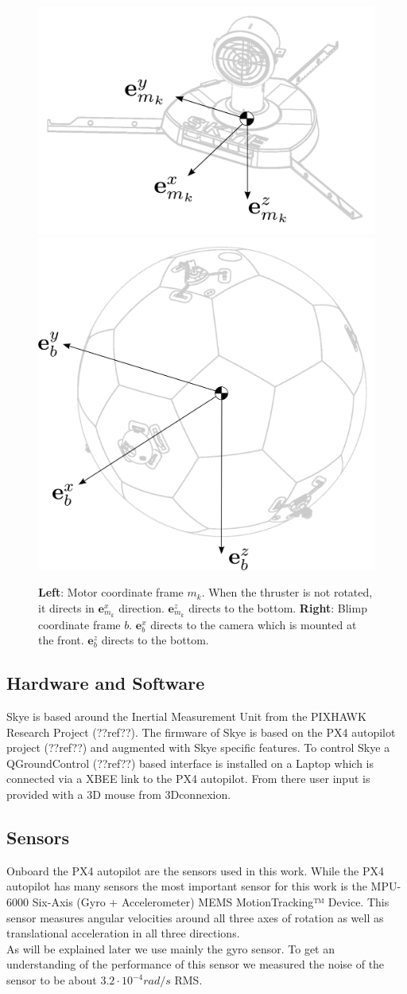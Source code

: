 \begin{figure}[hbtp]
\centering
\includegraphics[width=.4\linewidth]{images/motor_frame.png}
\includegraphics[width=.4\linewidth]{images/blimp_frame.png}
\caption{\textbf{Left}: Motor coordinate frame $m_k$. When the thruster is not rotated, it directs in $\mathbf{e}^x_{m_k}$ direction. $\mathbf{e}^z_{m_k}$ directs to the bottom. \textbf{Right}: Blimp coordinate frame $b$. $\mathbf{e}^x_{b}$ directs to the camera which is mounted at the front. $\mathbf{e}^z_{b}$ directs to the bottom.}
\label{fig:frames}
\end{figure}

\subsection{Hardware and Software}
Skye is based around the Inertial Measurement Unit from the PIXHAWK Research Project (??ref??). 
The firmware of Skye is based on the PX4 autopilot project (??ref??) and augmented with Skye specific features.
To control Skye a QGroundControl (??ref??) based interface is installed on a Laptop which is connected via a XBEE link to the PX4 autopilot.
From there user input is provided with a 3D mouse from 3Dconnexion.

\subsection{Sensors}
Onboard the PX4 autopilot are the sensors used in this work.
While the PX4 autopilot has many sensors the most important sensor for this work is the MPU-6000 Six-Axis (Gyro + Accelerometer) MEMS MotionTracking™ Device.
This sensor measures angular velocities around all three axes of rotation as well as translational acceleration in all three directions. \\
As will be explained later we use mainly the gyro sensor. To get an understanding of the performance of this sensor we measured the noise of the sensor to be about $3.2 \cdot 10^{-4}rad/s$ RMS.

